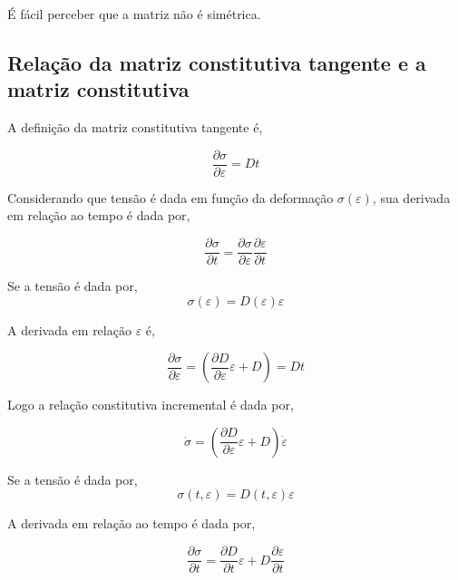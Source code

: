 \documentclass[12pt,a4paper]{article}
\begin{document}
\noindent
É fácil perceber que a matriz não é simétrica.


\subsection{Relação da matriz constitutiva tangente e a matriz constitutiva}

A definição da matriz constitutiva tangente é,

\begin{equation}
\frac{\partial \sigma}{\partial \varepsilon} = Dt
\end{equation}

Considerando que tensão é dada em função da deformação $\sigma(\varepsilon)$, sua derivada em relação ao tempo é dada por,

\begin{equation}
\frac{\partial \sigma}{\partial t} = \frac{\partial \sigma}{\partial \varepsilon} \frac{\partial \varepsilon}{\partial t}
\end{equation}

Se a tensão é dada por, 
\begin{equation}
\sigma(\varepsilon) = D(\varepsilon) \varepsilon
\end{equation}

\noindent
A derivada em relação $\varepsilon$ é,

\begin{equation}
\frac{\partial \sigma}{\partial \varepsilon} = \left(\frac{\partial D}{\partial \varepsilon} \varepsilon + D\right) = Dt
\end{equation}

\noindent
Logo a relação constitutiva incremental é dada por,

\begin{equation}
\dot {\sigma} = \left(\frac{\partial D}{\partial \varepsilon} \varepsilon + D\right) \dot{\varepsilon}
\end{equation}

Se a tensão é dada por, 
\begin{equation}
\sigma(t, \varepsilon) = D(t, \varepsilon) \varepsilon
\end{equation}

A derivada em relação ao tempo é dada por,

\begin{equation}
\frac{\partial \sigma}{\partial t} = \frac{\partial D}{\partial t} \varepsilon + D \frac{\partial \varepsilon}{\partial t}
\label{deriva_temp}
\end{equation}
\end{document}
